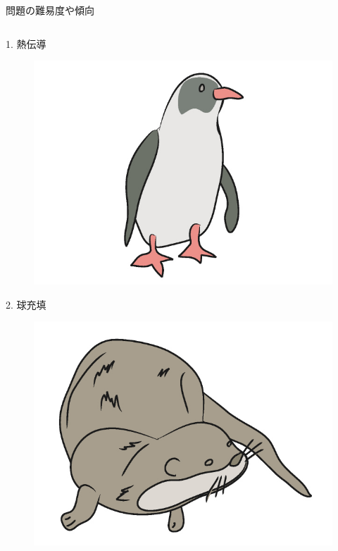 \documentclass[dvipdfmx]{beamer}
\newenvironment{wideitemize}{\itemize\setlength{\itemsep}{1em}}{\enditemize}
\begin{document}

%
%


\begin{frame}{問題の難易度や傾向}
\begin{columns}[t]
\begin{column}{0.5\textwidth}
\begin{wideitemize}
\item[1.] 熱伝導
\begin{figure}[htbp]
    \centering
    \includegraphics[bb=0 0 6.4 4.8, scale=0.07]{img/a01.jpg}
\end{figure}
\item[2.] 球充填
\begin{figure}[htbp]
    \centering
    \includegraphics[bb=0 0 6.4 4.8, scale=0.06]{img/a02.jpg}

\end{figure}
\end{wideitemize}
\end{column}
\end{columns}
\end{frame}
\end{document}
